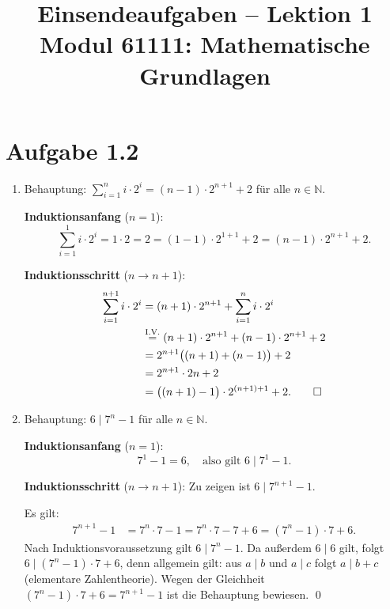 \documentclass[a4paper,12pt]{article}
\title{Einsendeaufgaben -- Lektion 1\\[0.5em]
\large Modul 61111: Mathematische Grundlagen}
\author{}
\date{}
\begin{document}
\maketitle

\section*{Aufgabe 1.2}

\begin{enumerate}[label=\alph*)]

\item Behauptung: $\displaystyle\sum_{i=1}^{n} i \cdot 2^i = (n-1)\cdot 2^{n+1} + 2$ für alle $n \in \mathbb{N}$.

\textbf{Induktionsanfang} ($n = 1$):
\[
  \sum_{i=1}^{1} i \cdot 2^i = 1 \cdot 2 = 2 = (1-1)\cdot 2^{1+1} + 2 = (n-1)\cdot 2^{n+1} + 2.
\]

\textbf{Induktionsschritt} ($n \to n+1$):
\begin{align*}
  \sum_{i=1}^{n+1} i \cdot 2^i
    &= (n+1)\cdot 2^{n+1} + \sum_{i=1}^{n} i \cdot 2^i \\
    &\stackrel{\mathrm{I.V.}}{=} (n+1)\cdot 2^{n+1} + (n-1)\cdot 2^{n+1} + 2 \\
    &= 2^{n+1}\bigl((n+1) + (n-1)\bigr) + 2 \\
    &= 2^{n+1} \cdot 2n + 2 \\
    &= \bigl((n+1)-1\bigr)\cdot 2^{(n+1)+1} + 2. \qed
\end{align*}

\item Behauptung: $6 \mid 7^n - 1$ für alle $n \in \mathbb{N}$.

\textbf{Induktionsanfang} ($n = 1$):
\[
  7^1 - 1 = 6, \quad \text{also gilt } 6 \mid 7^1 - 1.
\]

\textbf{Induktionsschritt} ($n \to n+1$): Zu zeigen ist $6 \mid 7^{n+1} - 1$.

Es gilt:
\begin{align*}
  7^{n+1} - 1 &= 7^n \cdot 7 - 1
               = 7^n \cdot 7 - 7 + 6
               = (7^n - 1) \cdot 7 + 6.
\end{align*}
Nach Induktionsvoraussetzung gilt $6 \mid 7^n - 1$.
Da außerdem $6 \mid 6$ gilt, folgt $6 \mid (7^n - 1) \cdot 7 + 6$,
denn allgemein gilt: aus $a \mid b$ und $a \mid c$ folgt $a \mid b + c$
(elementare Zahlentheorie).
Wegen der Gleichheit $(7^n - 1) \cdot 7 + 6 = 7^{n+1} - 1$ ist die Behauptung bewiesen. \qed

\end{enumerate}
\end{document}
